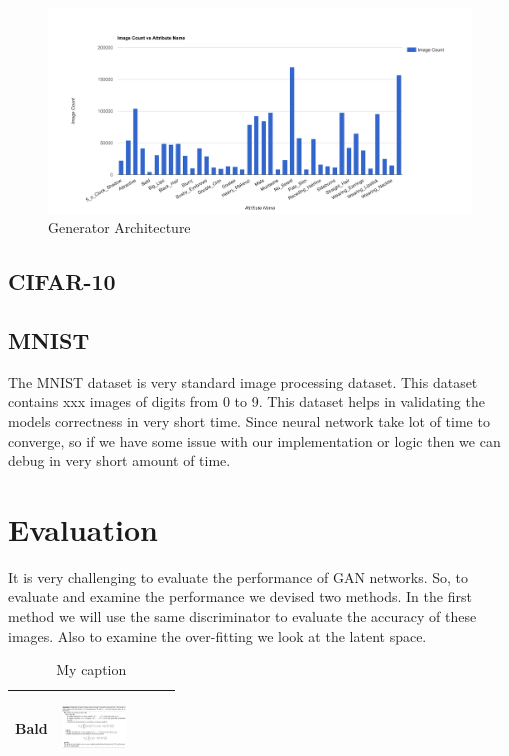 \begin{figure}[H]
  \centering
    \includegraphics[scale=.3, angle=0]{Files/celeba-visualize.png}
    \caption[Generator Architecture]{Generator Architecture\cite{DCGAN}}
    \label{fig:celeba}
\end{figure}
\subsection{CIFAR-10}

\subsection{MNIST}
The MNIST dataset is very standard image processing dataset. This dataset contains xxx images of digits from 0 to 9. This dataset helps in validating the models correctness in very short time. Since neural  network take lot of time to converge, so if we have some issue with our implementation or logic then we can debug in very short amount of time.



\section{Evaluation}
It is very challenging to evaluate the performance of GAN networks. So, to evaluate and examine the performance we devised two methods. In the first method we will use the same discriminator to evaluate the accuracy of these images. Also to examine the over-fitting we look at the latent space.   

\begin{table}[]
\centering
\caption{My caption}
\label{my-label}
\begin{tabular}{|l|llll|}
\hline
Bald & \includegraphics[width=1.69cm, height=1.69cm]{Files/Algorithm.png}  &  &  &  \\ \hline
 
\end{tabular}
\end{table}






